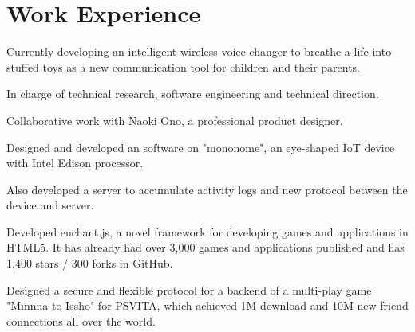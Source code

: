 \documentclass[letterpaper]{deedy-resume} %
\begin{document}
\begin{minipage}[t]{0.66\textwidth} %


\section{Work Experience}

\vspace{4mm}
\begin{tightitemize}
\item Currently developing an intelligent wireless voice changer to breathe a life into stuffed toys as a new communication tool for children and their parents.
\item In charge of technical research, software engineering and technical direction.
\item Collaborative work with Naoki Ono, a professional product designer.
\end{tightitemize}

\vspace{2mm} %

\begin{tightitemize}
\item Designed and developed an software on "mononome", an eye-shaped IoT device with Intel Edison processor.
\item Also developed a server to accumulate activity logs and new protocol between the device and server.
\end{tightitemize}

\vspace{2mm} 

\begin{tightitemize}
\item Developed enchant.js, a novel framework for developing games and applications in HTML5. It has already had over 3,000 games and applications published and has 1,400 stars / 300 forks in GitHub.
\item Designed a secure and flexible protocol for a backend of a multi-play game "Minnna-to-Issho" for PSVITA, which achieved 1M download and 10M new friend connections all over the world.
\end{tightitemize}


\end{minipage}
\end{document}
